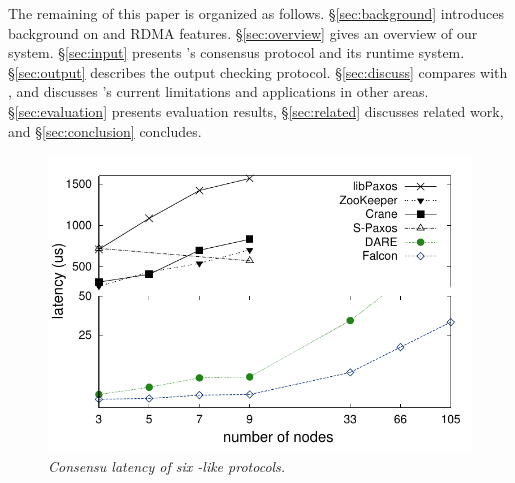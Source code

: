 

The remaining of this paper is organized as follows. 
\S\ref{sec:background} introduces background on \paxos and RDMA features. 
\S\ref{sec:overview} gives an overview of our \xxx system. \S\ref{sec:input} 
presents \xxx's consensus protocol and its runtime system. \S\ref{sec:output} 
describes the output checking protocol. \S\ref{sec:discuss} compares \dare with 
\xxx, and discusses \xxx's current limitations and applications in other areas. 
\S\ref{sec:evaluation} presents evaluation results, \S\ref{sec:related} 
discusses related work, and \S\ref{sec:conclusion} concludes. 

\begin{figure}[t]
\centering
\vspace{-.10in}
\includegraphics[width=.5\textwidth]{figures/traditional_paxos_latency}
\vspace{-.3in}
\caption{{\em Consensu latency of six \paxos-like protocols.}} 
\label{fig:scalability}
\vspace{-.20in}
\end{figure}